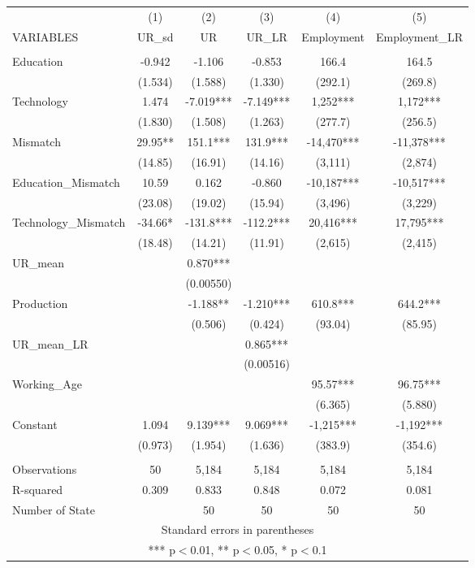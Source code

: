 \documentclass[]{article}
\begin{document}
\begin{tabular}{lccccc} \hline
 & (1) & (2) & (3) & (4) & (5) \\
VARIABLES & UR\_sd & UR & UR\_LR & Employment & Employment\_LR \\ \hline
 &  &  &  &  &  \\
Education & -0.942 & -1.106 & -0.853 & 166.4 & 164.5 \\
 & (1.534) & (1.588) & (1.330) & (292.1) & (269.8) \\
Technology & 1.474 & -7.019*** & -7.149*** & 1,252*** & 1,172*** \\
 & (1.830) & (1.508) & (1.263) & (277.7) & (256.5) \\
Mismatch & 29.95** & 151.1*** & 131.9*** & -14,470*** & -11,378*** \\
 & (14.85) & (16.91) & (14.16) & (3,111) & (2,874) \\
Education\_Mismatch & 10.59 & 0.162 & -0.860 & -10,187*** & -10,517*** \\
 & (23.08) & (19.02) & (15.94) & (3,496) & (3,229) \\
Technology\_Mismatch & -34.66* & -131.8*** & -112.2*** & 20,416*** & 17,795*** \\
 & (18.48) & (14.21) & (11.91) & (2,615) & (2,415) \\
UR\_mean &  & 0.870*** &  &  &  \\
 &  & (0.00550) &  &  &  \\
Production &  & -1.188** & -1.210*** & 610.8*** & 644.2*** \\
 &  & (0.506) & (0.424) & (93.04) & (85.95) \\
UR\_mean\_LR &  &  & 0.865*** &  &  \\
 &  &  & (0.00516) &  &  \\
Working\_Age &  &  &  & 95.57*** & 96.75*** \\
 &  &  &  & (6.365) & (5.880) \\
Constant & 1.094 & 9.139*** & 9.069*** & -1,215*** & -1,192*** \\
 & (0.973) & (1.954) & (1.636) & (383.9) & (354.6) \\
 &  &  &  &  &  \\
Observations & 50 & 5,184 & 5,184 & 5,184 & 5,184 \\
R-squared & 0.309 & 0.833 & 0.848 & 0.072 & 0.081 \\
 Number of State &  & 50 & 50 & 50 & 50 \\ \hline
\multicolumn{6}{c}{ Standard errors in parentheses} \\
\multicolumn{6}{c}{ *** p$<$0.01, ** p$<$0.05, * p$<$0.1} \\
\end{tabular}
\end{document}
